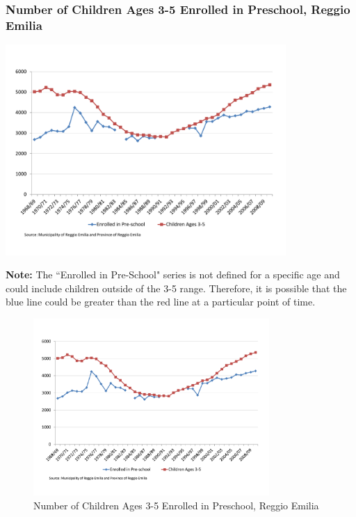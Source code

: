 \documentclass[static]{JJH-Beamer_PAGENOS}
\begin{document}
\begin{frame}
\frametitle{Number of Children Ages 3-5 Enrolled in Preschool, Reggio Emilia}
\begin{center}
\includegraphics[width=0.8\textwidth]{../../output/image/Enrollement_Preschool_RE.pdf}
\end{center}
\tiny{\textbf{Note:} The ``Enrolled in Pre-School" series is not defined for a specific age and could include children outside of the 3-5 range. Therefore, it is possible that the blue line could be greater than the red line at a particular point of time.}
 
\centering
\begin{figure}[H]
\caption{Number of Children Ages 3-5 Enrolled in Preschool, Reggio Emilia}
\includegraphics[width=0.8\textwidth]{../../output/image/Enrollement_Preschool_RE.pdf}
\end{figure}
\end{frame}
\end{document}

